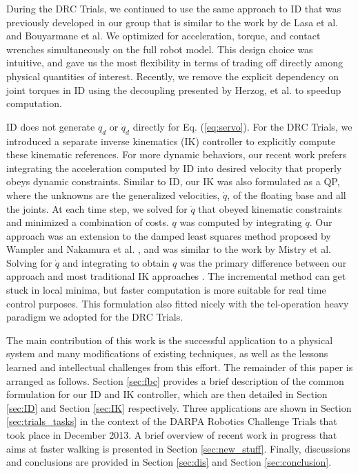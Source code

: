 \documentclass{ws-ijhr}
\newcommand{\eref}[1] {Eq. (\ref{#1})}
\newcommand{\sref}[1] {Section \ref{#1}}
\begin{document}
During the DRC Trials, we continued to use the same approach to ID that was 
previously developed in our group \cite{stephens_thesis,whitman_thesis,sfeng_online} 
that is similar to the work by de Lasa et al. \cite{deLasa_hir} and 
Bouyarmane et al. \cite{bouyarmane_vrc} 
We optimized for acceleration, torque, and contact wrenches simultaneously 
on the full robot model. This design choice was intuitive, and gave us the
most flexibility in terms of trading off directly among physical quantities
of interest. Recently, we remove the explicit dependency on joint torques in
ID using the decoupling presented by Herzog, et al. \cite{alex_hir} to speedup
computation.

ID does not generate $q_d$ or $\dot{q}_d$ directly for \eref{eq:servo}.
For the DRC Trials, we introduced a separate inverse kinematics (IK) controller to
explicitly compute these kinematic references. 
For more dynamic behaviors, our recent work prefers integrating the acceleration
computed by ID into desired velocity that properly obeys dynamic constraints.  
Similar to ID, our IK was also formulated as a QP, where the unknowns are the 
generalized velocities, $\dot{q}$, of the floating base and all the joints. 
At each time step, we solved for $\dot{q}$ that obeyed kinematic constraints 
and minimized a combination of costs. $q$ was computed by integrating $\dot{q}$. 
Our approach was an extension to the damped least squares method proposed by 
Wampler and Nakamura et al. \cite{wampler_damped_ik,nakamura_ik}, and was 
similar to the work by Mistry et al.\cite{mistry_ik} 
Solving for $\dot{q}$ and integrating to obtain $q$ was the primary difference
between our approach and most traditional IK approaches 
\cite{kajita03,asimo,hrp2}. 
The incremental method can get stuck in local minima, but faster computation
is more suitable for real time control purposes. 
This formulation also fitted nicely with the tel-operation heavy paradigm we 
adopted for the DRC Trials. 

The main contribution of this work is the successful application to a physical 
system and many modifications of existing techniques, as well as 
the lessons learned and intellectual challenges from this effort. 
The remainder of this paper is arranged as follows. 
\sref{sec:fbc} provides a brief description of the common formulation for 
our ID and IK controller, which are then detailed in \sref{sec:ID} and \sref{sec:IK}
respectively.
Three applications are shown in \sref{sec:trials_tasks} 
in the context of the DARPA Robotics Challenge Trials that took place in 
December 2013. 
A brief overview of recent work in progress that aims at faster walking 
is presented in \sref{sec:new_stuff}.
Finally, discussions and conclusions are provided 
in \sref{sec:dis} and \sref{sec:conclusion}.
\end{document}
